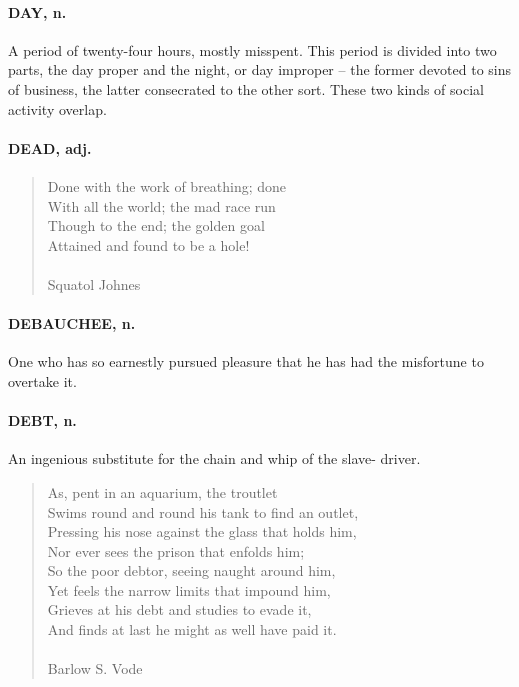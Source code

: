 \documentclass[11pt]{article}
\begin{document}
\paragraph{DAY, n.}  A period of twenty-four hours, mostly misspent.  This period
is divided into two parts, the day proper and the night, or day
improper -- the former devoted to sins of business, the latter
consecrated to the other sort.  These two kinds of social activity
overlap.

\paragraph{DEAD, adj.}

\begin{quote}   Done with the work of breathing; done \\
  With all the world; the mad race run \\
  Though to the end; the golden goal \\
  Attained and found to be a hole! \\
 \\
Squatol Johnes \end{quote}


\paragraph{DEBAUCHEE, n.}  One who has so earnestly pursued pleasure that he has
had the misfortune to overtake it.

\paragraph{DEBT, n.}  An ingenious substitute for the chain and whip of the slave-
driver.

\begin{quote}   As, pent in an aquarium, the troutlet \\
  Swims round and round his tank to find an outlet, \\
  Pressing his nose against the glass that holds him, \\
  Nor ever sees the prison that enfolds him; \\
  So the poor debtor, seeing naught around him, \\
  Yet feels the narrow limits that impound him, \\
  Grieves at his debt and studies to evade it, \\
  And finds at last he might as well have paid it. \\
 \\
Barlow S. Vode \end{quote}
\end{document}

